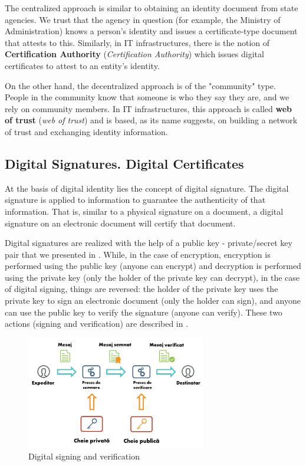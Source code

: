 The centralized approach is similar to obtaining an identity document from state agencies.
We trust that the agency in question (for example, the Ministry of Administration) knows a person's identity and issues a certificate-type document that attests to this.
Similarly, in IT infrastructures, there is the notion of \textbf{Certification Authority} (\textit{Certification Authority}) which issues digital certificates to attest to an entity's identity.

On the other hand, the decentralized approach is of the "community" type.
People in the community know that someone is who they say they are, and we rely on community members.
In IT infrastructures, this approach is called \textbf{web of trust} (\textit{web of trust}) and is based, as its name suggests, on building a network of trust and exchanging identity information.

\subsection{Digital Signatures.
Digital Certificates}
\label{sec:sec:transfer:sign}

At the basis of digital identity lies the concept of digital signature.
The digital signature is applied to information to guarantee the authenticity of that information.
That is, similar to a physical signature on a document, a digital signature on an electronic document will certify that document.

Digital signatures are realized with the help of a public key - private/secret key pair that we presented in .
While, in the case of encryption, encryption is performed using the public key (anyone can encrypt) and decryption is performed using the private key (only the holder of the private key can decrypt), in the case of digital signing, things are reversed: the holder of the private key uses the private key to sign an electronic document (only the holder can sign), and anyone can use the public key to verify the signature (anyone can verify).
These two actions (signing and verification) are described in .

\begin{figure}[htbp]
  \centering
  \def\svgwidth{\columnwidth}
  \includegraphics[width=0.7\textwidth]{chapters/12-auth/img/digital-signature.svg.pdf}
  \caption{Digital signing and verification}
  \label{fig:sec:digital-signature}
\end{figure}

